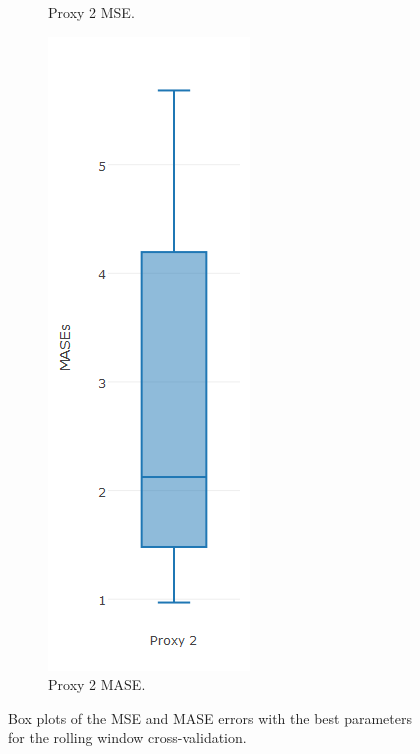 \begin{figure}[!h]
{\begin{subfigure}{.25\linewidth}
  \caption{Proxy 2 MSE.}
  \label{fig:bp3}
\end{subfigure}
\begin{subfigure}{.25\linewidth}
  \centering
  \includegraphics[width=\linewidth]{img/6mmaMasebp.png}
  \caption{Proxy 2 MASE.}
  \label{fig:bp4}
\end{subfigure}}
\caption{Box plots of the MSE and MASE errors with the best parameters for the rolling window cross-validation.}
\end{figure}